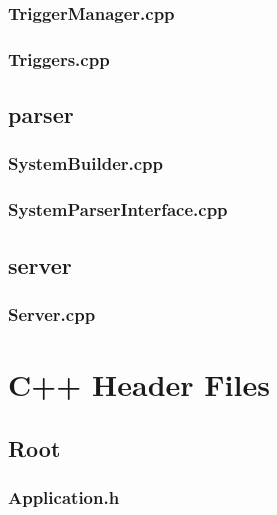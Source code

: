 \subsection{TriggerManager.cpp}


\subsection{Triggers.cpp}


\section{parser}

\subsection{SystemBuilder.cpp}


\subsection{SystemParserInterface.cpp}


\section{server}

\subsection{Server.cpp}


\chapter{C++ Header Files}

\section{Root}

\subsection{Application.h}


